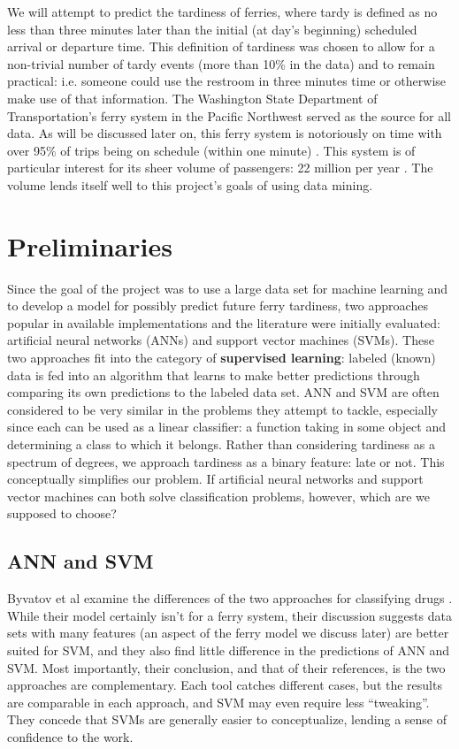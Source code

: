 \documentclass[11pt]{article} %
\begin{document}
We will attempt to predict the tardiness of ferries, where tardy is 
defined as no less than three minutes later than the
initial (at day's beginning) scheduled arrival or departure time. This definition
of tardiness was chosen to allow for a non-trivial number of tardy events 
(more than 10\% in the data) and to remain practical: i.e. someone could use the
restroom in three minutes time or otherwise make use of that information. The 
Washington State Department of Transportation's ferry system in the Pacific
Northwest served as the source for all data. As will be discussed later on, 
this ferry system is notoriously on time with over 95\% of trips being on 
schedule (within one minute) \cite{wsdotComparison}. This system is of 
particular interest for its sheer volume of passengers: 22 million per year 
\cite{wsfTraffic}.  The volume lends itself well to this project's goals of 
using data mining. 



\section{Preliminaries}
\label{sec:prelims}
Since the goal of the project was to use a large data set for machine learning 
and to develop a model for possibly predict future ferry tardiness, two approaches
popular in available implementations and the literature were initially evaluated:
artificial neural networks (ANNs) and support vector machines (SVMs). These two 
approaches fit into the
category of \textbf{supervised learning}: labeled (known) data is fed into an
algorithm that learns to make better predictions through comparing its own 
predictions to the labeled data set. ANN and SVM are often considered to be
very similar in the problems they attempt to tackle, especially since each can
be used as a linear classifier: a function taking in some object and determining 
a class to which it belongs. Rather than considering tardiness as a spectrum of
degrees, we approach tardiness as a binary feature: late or not. This conceptually
simplifies our problem.  
If artificial neural networks and support vector 
machines can both solve classification problems, however, which are we supposed
to choose?

\subsection{ANN and SVM}
\label{sec:ann_svm}
Byvatov et al examine the differences of the two approaches for classifying drugs
\cite{byvatov2003comparison}. While their model certainly isn't for a ferry 
system, their discussion suggests data sets with many features (an aspect of the 
ferry model we discuss later) are better suited for SVM, and they also find little
difference in the predictions of ANN and SVM. Most importantly, their conclusion,
and that of their references, is the two approaches are complementary. Each 
tool catches different cases, but the results are comparable in each approach,
and SVM may even require less ``tweaking''. They concede that SVMs are generally
easier to conceptualize, lending a sense of confidence to the work.
\end{document}
